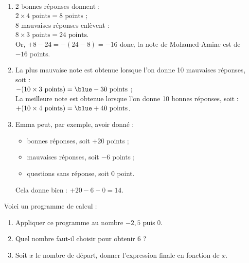 \begin{colonne*exercice}
\begin{corrige}
   \ \\ [-5mm]
   \begin{enumerate}
      \item 2 bonnes réponses donnent  : \\
         $2\times4\text{ points} =8\text{ points}$ ; \\
         8 mauvaises réponses enlèvent : \\
         $8\times3\text{ points} =24\text{ points}$. \\
         Or, $+8-24 =-(24-8) =-16$ donc, la note de Mohamed-Amine est de {\blue $-16$ points}.
      \item La plus mauvaise note est obtenue lorsque l'on donne 10 mauvaises réponses, soit : \\
         $-(10\times3\text{ points}) =\blue -30\text{ points}$ ; \\
         La meilleure note est obtenue lorsque l'on donne 10 bonnes réponses, soit  : \\
         $+(10\times4\text{ points}) =\blue +40\text{ points}$. \\
      \item Emma peut, par exemple, avoir donné :
         \begin{itemize}
            \item { bonnes réponses}, soit +20 points ;
            \item { mauvaises réponses}, soit $-6$ points ; 
            \item { questions sans réponse}, soit 0 point.
         \end{itemize}
      Cela donne bien : $+20-6+0 =14$.
   \end{enumerate}
\end{corrige}

\bigskip


\begin{exercice} %
   Voici un programme de calcul :
   \begin{center}
   \end{center}
   \begin{enumerate}
      \item Appliquer ce programme au nombre $-2,5$ puis 0.
      \item Quel nombre faut-il choisir pour obtenir 6 ?
      \item Soit $x$ le nombre de départ, donner l'expression finale en fonction de $x$.
   \end{enumerate}
\end{exercice}


\end{colonne*exercice}

